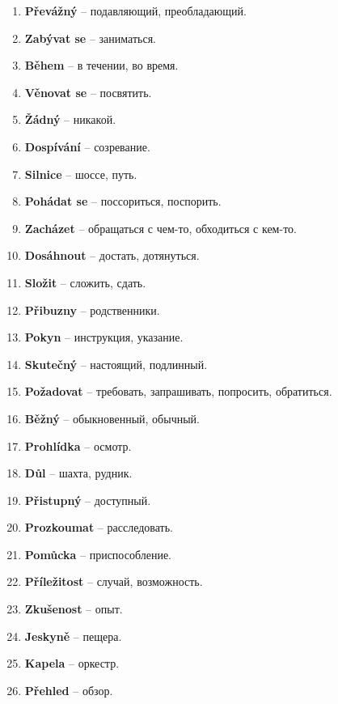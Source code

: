 \documentclass[12pt]{book}
\begin{document}
\begin{enumerate}
    \item \textbf{Převážný} -- \textrussian{подавляющий, преобладающий}.
    \item \textbf{Zabývat se} -- \textrussian{заниматься}.
    \item \textbf{Během} -- \textrussian{в течении, во время}.
    \item \textbf{Věnovat se} -- \textrussian{посвятить}.
    \item \textbf{Žádný} -- \textrussian{никакой}. 
    \item \textbf{Dospívání} -- \textrussian{созревание}.
    \item \textbf{Silnice} -- \textrussian{шоссе, путь}.
    \item \textbf{Pohádat se} -- \textrussian{поссориться, поспорить}.
    \item \textbf{Zacházet} -- \textrussian{обращаться с чем-то, обходиться с кем-то}.
    \item \textbf{Dosáhnout} -- \textrussian{достать, дотянуться}.
    \item \textbf{Složit} -- \textrussian{сложить, сдать}.
    \item \textbf{Přibuzny} -- \textrussian{родственники}.
    \item \textbf{Pokyn} -- \textrussian{инструкция, указание}.
    \item \textbf{Skutečný} -- \textrussian{настоящий, подлинный}.
    \item \textbf{Požadovat} -- \textrussian{требовать, запрашивать, попросить, обратиться}.
    \item \textbf{Běžný} -- \textrussian{обыкновенный, обычный}.
    \item \textbf{Prohlídka} -- \textrussian{осмотр}.
    \item \textbf{Důl} -- \textrussian{шахта, рудник}.
    \item \textbf{Přistupný} -- \textrussian{доступный}.
    \item \textbf{Prozkoumat} -- \textrussian{расследовать}.
    \item \textbf{Pomůcka} -- \textrussian{приспособление}.
    \item \textbf{Příležitost} -- \textrussian{случай, возможность}.
    \item \textbf{Zkušenost} -- \textrussian{опыт}.
    \item \textbf{Jeskyně} -- \textrussian{пещера}.
    \item \textbf{Kapela} -- \textrussian{оркестр}.
    \item \textbf{Přehled} -- \textrussian{обзор}.

\end{enumerate}
\end{document}
